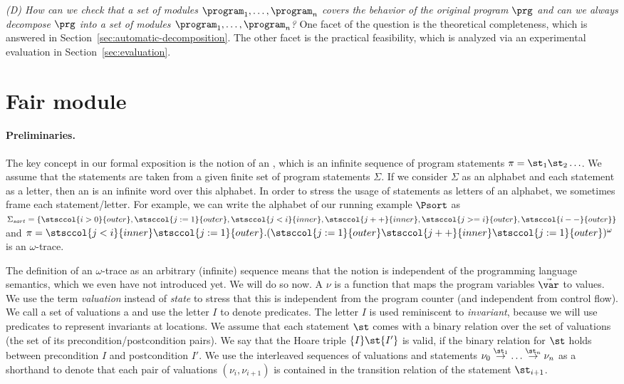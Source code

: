 \emph{(D) How can we check that a set of modules $\program_1,\ldots,\program_n$ covers the behavior of the original program $\prg$ and can we always decompose $\prg$ into a set of modules $\program_1,\ldots,\program_n$?}
One facet of the question is the theoretical completeness, which is answered in Section~\ref{sec:automatic-decomposition}. The other facet is the practical feasibility, which is analyzed via an experimental evaluation in Section~\ref{sec:evaluation}.











\section{Fair module}
\label{sec:decomposition}

\paragraph{Preliminaries.}
The key concept in our formal exposition is the notion of an
, which is an infinite sequence of program
statements
$\pi=\st_1\st_2\ldots$.
We assume that the statements are taken from a given finite set of program statements $\Sigma$. 
If we consider $\Sigma$ as an alphabet and each statement as a letter,
then an  
is an infinite word over this alphabet.
In order to stress the usage of statements as letters of an alphabet,
we sometimes frame each statement/letter.  For example, we can write
the alphabet of our running example $\Psort$ as
$
\Sigma_{sort}=\{ \stsccol{i>0}{outer}, \stsccol{j:=1}{outer}, \stsccol{j<i}{inner}, \stsccol{j++}{inner}, \stsccol{j>=i}{outer}, \stsccol{i--}{outer}\}
$
and
$
\pi = \stsccol{j<i}{inner} \stsccol{j:=1}{outer} . ( \stsccol{j:=1}{outer} \stsccol{j++}{inner} \stsccol{j:=1}{outer} )^\omega
$
is an $\omega$-trace. 

The definition of an $\omega$-trace as an arbitrary (infinite) sequence means
that the notion is independent of the programming language
semantics,  which we even have not introduced yet.  We will do so now.
A  $\nu$ is a function that maps the program variables $\vec\var$ to values.
We use the term \emph{valuation} instead of \emph{state} to stress that this is independent from the program counter (and independent from control flow).
We call a set of valuations a  and use the letter $I$ to denote predicates.
The letter $I$ is used reminiscent to \emph{invariant}, because we will use predicates to represent invariants at locations.
We assume that each statement $\st$ comes with a binary relation over the set of valuations (the set of its precondition/postcondition pairs). 
We say that the Hoare triple $\{ I \} \st \{ I'\}$ is valid, if the binary relation for $\st$ holds between precondition $I$ and postcondition $I'$.
We use the interleaved sequences of valuations and statements
$\nu_0\stackrel{\st_{1}}{\rightarrow}\ldots\stackrel{\st_{n}}{\rightarrow}\nu_n$
as a shorthand to denote that each pair of valuations $(\nu_i,\nu_{i+1})$ is contained in the transition relation of the statement $\st_{i+1}$.

